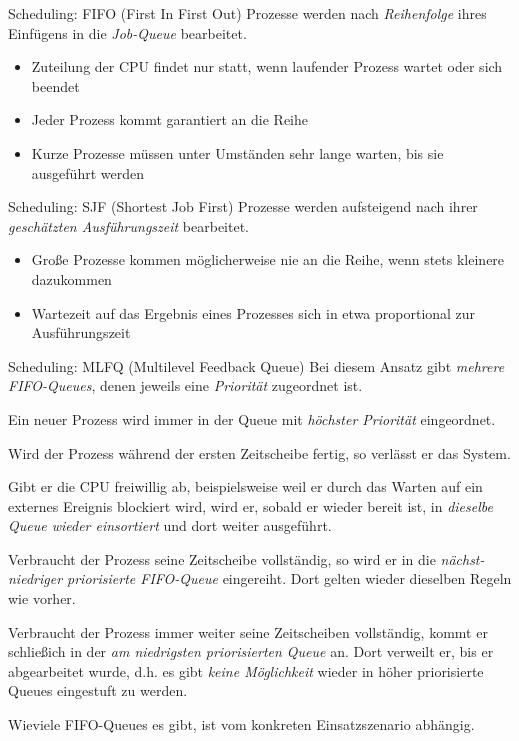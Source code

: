 \documentclass[german]{spicker}
\begin{document}
\begin{algo}{Scheduling: FIFO (First In First Out)}
    Prozesse werden nach \emph{Reihenfolge} ihres Einfügens in die \emph{Job-Queue} bearbeitet.
    \begin{itemize}
        \item Zuteilung der CPU findet nur statt, wenn laufender Prozess wartet oder sich beendet
        \item Jeder Prozess kommt garantiert an die Reihe
        \item Kurze Prozesse müssen unter Umständen sehr lange warten, bis sie ausgeführt werden
    \end{itemize}
\end{algo}

\begin{algo}{Scheduling: SJF (Shortest Job First)}
    Prozesse werden aufsteigend nach ihrer \emph{geschätzten Ausführungszeit} bearbeitet.
    \begin{itemize}
        \item Große Prozesse kommen möglicherweise nie an die Reihe, wenn stets kleinere dazukommen
        \item Wartezeit auf das Ergebnis eines Prozesses sich in etwa proportional zur Ausführungszeit
    \end{itemize}
\end{algo}

\begin{algo}{Scheduling: MLFQ (Multilevel Feedback Queue)}
    Bei diesem Ansatz gibt \emph{mehrere FIFO-Queues}, denen jeweils
    eine \emph{Priorität} zugeordnet ist.

    Ein neuer Prozess wird immer in der Queue mit
    \emph{höchster Priorität} eingeordnet.

    Wird der Prozess während der ersten Zeitscheibe fertig,
    so verlässt er das System.

    Gibt er die CPU freiwillig ab, beispielsweise weil er
    durch das Warten auf ein externes Ereignis blockiert wird, wird er, sobald er wieder
    bereit ist, in \emph{dieselbe Queue wieder einsortiert} und dort weiter ausgeführt.

    Verbraucht der Prozess seine Zeitscheibe vollständig, so wird er in die \emph{nächst-niedriger priorisierte FIFO-Queue} eingereiht. Dort gelten wieder dieselben Regeln wie vorher.

    Verbraucht der Prozess immer weiter seine Zeitscheiben vollständig, kommt er
    schließich in der \emph{am niedrigsten priorisierten Queue} an.
    Dort verweilt er, bis er abgearbeitet wurde, d.h. es gibt \emph{keine Möglichkeit} wieder in höher priorisierte Queues
    eingestuft zu werden.

    Wieviele FIFO-Queues es gibt, ist vom konkreten Einsatzszenario abhängig.
\end{algo}
\end{document}
